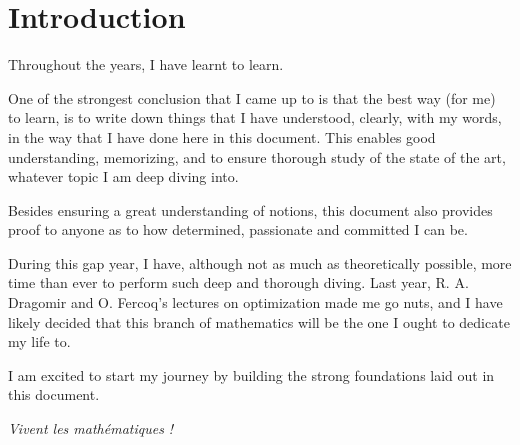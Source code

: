 \chapter*{Introduction}
\pagestyle{fancy}

Throughout the years, I have learnt to learn. 

One of the strongest conclusion that I came up to is that the best way (for me) to learn, is to write down things that I have understood, clearly, with my words, in the way that I have done here in this document. This enables good understanding, memorizing, and to ensure thorough study of the state of the art, whatever topic I am deep diving into.

Besides ensuring a great understanding of notions, this document also provides proof to anyone as to how determined, passionate and committed I can be.

During this gap year, I have, although not as much as theoretically possible, more time than ever to perform such deep and thorough diving. Last year, R. A. Dragomir and  O. Fercoq's lectures on optimization made me go nuts, and I have likely decided that this branch of mathematics will be the one I ought to dedicate my life to.

I am excited to start my journey by building the strong foundations laid out in this document.

\textit{Vivent les mathématiques !}

